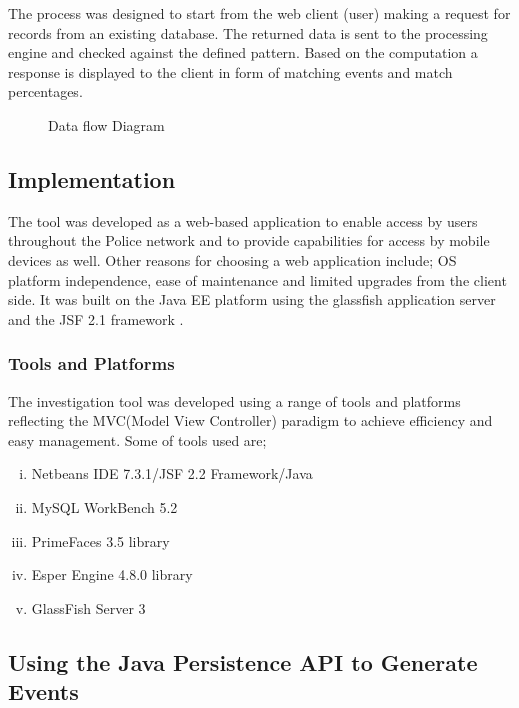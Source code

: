 \noindent The process was designed to start from the web client (user) making a request for records from an existing database. The returned data is sent to the processing engine and checked against the defined pattern. Based on the computation a response is displayed to the client in form of matching events and match percentages.

\begin{center}
\begin{figure}[h]
\caption{Data flow Diagram}

\end{figure}
\end{center}

\subsection{Implementation}

\noindent The tool was developed as a web-based application to enable access by users throughout the Police network and to provide capabilities for access by mobile devices as well. Other reasons for choosing a web application include; OS platform independence, ease of maintenance and limited upgrades from the client side. It was built on the Java EE platform using the glassfish application server and the JSF 2.1 framework \cite{twentythree}.


\subsubsection{Tools and Platforms}

\noindent The investigation tool was developed using a range of tools and platforms  reflecting  the MVC(Model View Controller) paradigm  to achieve efficiency and easy management. Some of tools used are;

\begin{enumerate}[(i)]
\item Netbeans IDE 7.3.1/JSF 2.2 Framework/Java
\item MySQL WorkBench 5.2
\item PrimeFaces 3.5 library
\item Esper Engine 4.8.0 library
\item GlassFish Server 3
 

 \end{enumerate}


\subsection{Using the Java Persistence API  to Generate Events}

